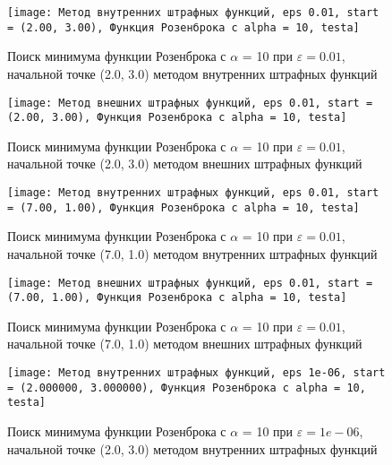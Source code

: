             \begin{figure}[H]
	        \centering
	        \texttt{[image: Метод внутренних штрафных функций, eps 0.01, start = (2.00, 3.00), Функция Розенброка с alpha = 10, testa]}%
	        \caption{Поиск минимума функции Розенброка с $\alpha$ = 10 при $\varepsilon = 0.01$, начальной точке (2.0, 3.0) методом внутренних штрафных функций}
	        \vspace*{-1.2cm}
            \end{figure}
            
            \begin{figure}[H]
	        \centering
	        \texttt{[image: Метод внешних штрафных функций, eps 0.01, start = (2.00, 3.00), Функция Розенброка с alpha = 10, testa]}%
	        \caption{Поиск минимума функции Розенброка с $\alpha$ = 10 при $\varepsilon = 0.01$, начальной точке (2.0, 3.0) методом внешних штрафных функций}
	        \vspace*{-1.2cm}
            \end{figure}
            
            \begin{figure}[H]
	        \centering
	        \texttt{[image: Метод внутренних штрафных функций, eps 0.01, start = (7.00, 1.00), Функция Розенброка с alpha = 10, testa]}%
	        \caption{Поиск минимума функции Розенброка с $\alpha$ = 10 при $\varepsilon = 0.01$, начальной точке (7.0, 1.0) методом внутренних штрафных функций}
	        \vspace*{-1.2cm}
            \end{figure}
            
            \begin{figure}[H]
	        \centering
	        \texttt{[image: Метод внешних штрафных функций, eps 0.01, start = (7.00, 1.00), Функция Розенброка с alpha = 10, testa]}%
	        \caption{Поиск минимума функции Розенброка с $\alpha$ = 10 при $\varepsilon = 0.01$, начальной точке (7.0, 1.0) методом внешних штрафных функций}
	        \vspace*{-1.2cm}
            \end{figure}
            
            \begin{figure}[H]
	        \centering
	        \texttt{[image: Метод внутренних штрафных функций, eps 1e-06, start = (2.000000, 3.000000), Функция Розенброка с alpha = 10, testa]}%
	        \caption{Поиск минимума функции Розенброка с $\alpha$ = 10 при $\varepsilon = 1e-06$, начальной точке (2.0, 3.0) методом внутренних штрафных функций}
	        \vspace*{-1.2cm}
            \end{figure}
            
